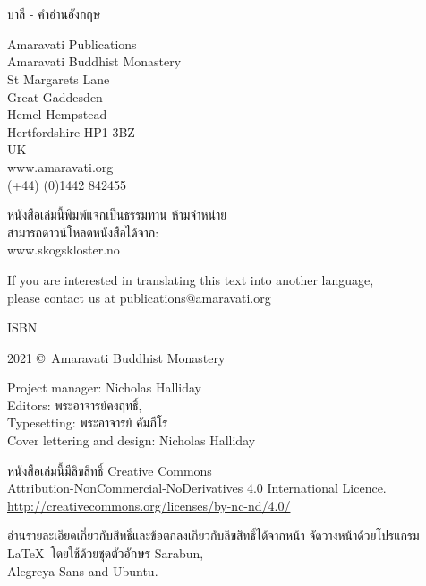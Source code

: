 
\thispagestyle{empty}

\resumeNormalText

\enlargethispage{\baselineskip}

{\centering
\ifaivedition
\fontsize{12}{15}\selectfont
\else
\small
\fi
\setlength{\parskip}{15pt}

{\normalsize
\thetitle\\
\thesubtitle\\
บาลี - คำอ่านอังกฤษ}

Amaravati Publications\\
Amaravati Buddhist Monastery\\
St Margarets Lane\\
Great Gaddesden\\
Hemel Hempstead\\
Hertfordshire HP1 3BZ\\
UK\\
www.amaravati.org\\
(+44) (0)1442 842455

หนังสือเล่มนี้พิมพ์แจกเป็นธรรมทาน ห้ามจำหน่าย\\
สามารถดาวน์โหลดหนังสือได้จาก:\\
www.skogskloster.no

If you are interested in translating this text into another language,\\
please contact us at publications@amaravati.org

ISBN \theISBN

2021 \copyright\ Amaravati Buddhist Monastery

Project manager: Nicholas Halliday\\
Editors: พระอาจารย์คงฤทธิ์,\\
Typesetting: พระอาจารย์ คัมภีโร\\
Cover lettering and design: Nicholas Halliday

\vfill

หนังสือเล่มนี้มีลิขสิทธิ์ Creative Commons\\
Attribution-NonCommercial-NoDerivatives 4.0 International Licence.\\
\href{http://creativecommons.org/licenses/by-nc-nd/4.0/}{http://creativecommons.org/licenses/by-nc-nd/4.0/}

อ่านรายละเอียดเกี่ยวกับสิทธิ์และข้อตกลงเกียวกับลิขสิทธิ์ได้จากหน้า \pageref{copyright-details}
จัดวางหน้าด้วยโปรแกรม \LaTeX\ โดยใช้ด้วยชุดตัวอักษร Sarabun,\\
Alegreya Sans and Ubuntu.

\theEditionInfo


}

\thaiText

